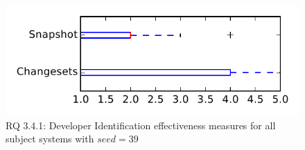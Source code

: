 
\begin{figure}
\centering
\includegraphics[height=0.4\textheight]{figures/dit_seed/rq1_tiny_39}
\caption{RQ 3.4.1: Developer Identification effectiveness measures for all subject systems with $seed=39$}
\label{fig:dit_seed:rq1:tiny}
\end{figure}
